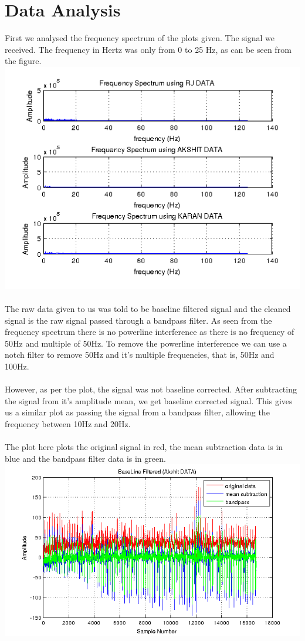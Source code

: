 \documentclass{article}
\begin{document}
\section{Data Analysis}
First we analysed the frequency spectrum of the plots given. The signal we
received. The frequency in Hertz was only from 0 to 25 Hz, as can be seen from
the figure. \\
\includegraphics[width=\textwidth]{freq} \\ \\ 
The raw data given to us was told to be baseline filtered signal and the cleaned
signal is the raw signal passed through a bandpass filter. As seen from the
frequency spectrum there is no powerline interference as there is no frequency
of 50Hz and multiple of 50Hz. To remove the powerline interference we can use
a notch filter to remove 50Hz and it's multiple frequencies, that is, 50Hz and
100Hz.\\ \\
However, as per the plot, the signal was not baseline corrected. After
subtracting the signal from it's amplitude mean, we get baseline corrected
signal. This gives us a similar plot as passing the signal from a bandpass
filter, allowing the frequency between 10Hz and 20Hz. \\ \\
The plot here plots the original signal in red, the mean subtraction data is in
blue and the bandpass filter data is in green. \\ 
\includegraphics[width=\textwidth]{baseline}  \\ \\
\end{document}
